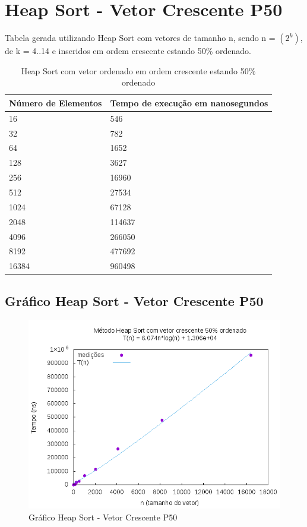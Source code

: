 \documentclass[12pt,a4paper,twoside]{report}
\begin{document}
\section{Heap Sort - Vetor Crescente P50}
Tabela gerada utilizando Heap Sort com vetores de tamanho n, sendo n = $(2^k)$, de k = 4..14 e inseridos em ordem crescente estando 50\% ordenado.
\begin{table}[H]
\centering
\caption{Heap Sort com vetor ordenado em ordem crescente estando 50\% ordenado}
\label{my-label}
\begin{tabular}{|l|l|}
\hline
\multicolumn{1}{|c|}{\textbf{Número de Elementos}} & \multicolumn{1}{c|}{\textbf{Tempo de execução em nanosegundos}} \\ \hline
16 & 546 \\ \hline
32 & 782 \\ \hline
64 & 1652 \\ \hline
128 & 3627 \\ \hline
256 & 16960 \\ \hline
512 & 27534 \\ \hline
1024 & 67128 \\ \hline
2048 & 114637 \\ \hline
4096 & 266050 \\ \hline
8192 & 477692 \\ \hline
16384 & 960498 \\ \hline
\end{tabular}
\end{table}

\subsection{Gráfico Heap Sort - Vetor Crescente P50}
\begin{figure}[H]
    \centering
    \includegraphics[width=0.7\linewidth]{graficos/HeapSort/vIntCrescenteP50/vIntCrescenteP50.png}
  \caption{Gráfico Heap Sort - Vetor Crescente P50}
\end{figure}
\end{document}
